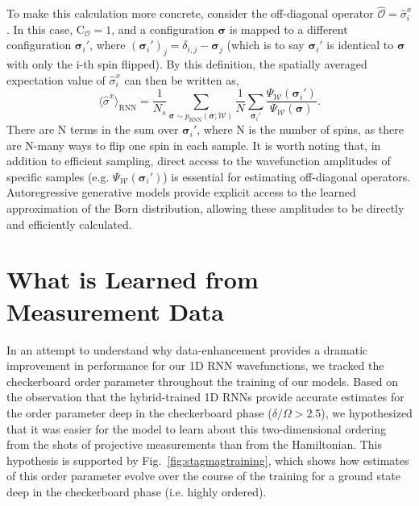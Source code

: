 \documentclass[twocolumn,
                showpacs,
                nofootinbib,
                nobibnotes,
                aps,
                superscriptaddress,
                amssymb,
                amsmath,
                floatfix,
                reprint,
                prx, 
                notitlepage,
                showkeys,
                10pt,
		]{revtex4-2}
\begin{document}
To make this calculation more concrete, consider the off-diagonal operator $\hat{\mathcal{O}} = \hat{\sigma}^x_i$. In this case, $\text{C}_{\mathcal{O}} = 1$, and a configuration $\boldsymbol\sigma$ is mapped to a different configuration $\boldsymbol\sigma_i\prime$, where $(\boldsymbol\sigma_i\prime)_j = \delta_{i,j} - \boldsymbol\sigma_j$ (which is to say $\boldsymbol\sigma_i\prime$ is identical to $\boldsymbol\sigma$ with only the i-th spin flipped). By this definition, the spatially averaged expectation value of $\hat\sigma^x_i$ can then be written as,
\begin{equation*}
    \langle\hat{\sigma}^x\rangle_{\text{RNN}} = \frac{1}{N_s}\sum_{\boldsymbol\sigma\sim p_{\text{RNN}}(\boldsymbol\sigma;\mathcal{W})}  \frac{1}{N}\sum_{\boldsymbol\sigma_i\prime} \frac{ \Psi_{\mathcal{W}}(\boldsymbol\sigma_i\prime)}{\Psi_{\mathcal{W}}(\boldsymbol\sigma)}.
\end{equation*}
There are N terms in the sum over $\boldsymbol\sigma_i\prime$, where N is the number of spins, as there are N-many ways to flip one spin in each sample.
It is worth noting that, in addition to efficient sampling, direct access to the wavefunction amplitudes of specific samples (e.g. $\Psi_{\mathcal{W}}(\boldsymbol\sigma_i\prime)$) is essential for estimating off-diagonal operators. Autoregressive generative models provide explicit access to the learned approximation of the Born distribution, allowing these amplitudes to be directly and efficiently calculated.


\section{What is Learned from Measurement Data}\label{app:stagmagtraining}

In an attempt to understand why data-enhancement provides a dramatic improvement in performance for our 1D RNN wavefunctions, we tracked the checkerboard order parameter throughout the training of our models. Based on the observation that the hybrid-trained 1D RNNs provide accurate estimates for the order parameter deep in the checkerboard phase ($\delta/\Omega > 2.5$), we hypothesized that it was easier for the model to learn about this two-dimensional ordering from the shots of projective measurements than from the Hamiltonian. This hypothesis is supported by Fig.~\ref{fig:stagmagtraining}, which shows how estimates of this order parameter evolve over the course of the training for a ground state deep in the checkerboard phase (i.e. highly ordered).
\end{document}
